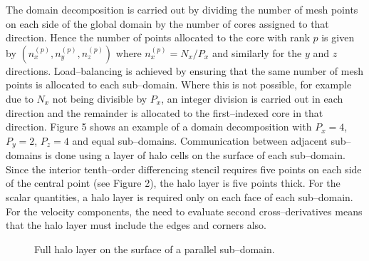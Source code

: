 \documentclass[dvips]{article}
\begin{document}
The domain decomposition is carried out by dividing the number of mesh points
on each side of the global domain by the number of cores assigned to that
direction.  Hence the number of points allocated to the core with rank $p$
is given by $(n_{x}^{(p)},n_{y}^{(p)},n_{z}^{(p)})$ where 
$n_{x}^{(p)}=N_{x}/P_{x}$ and similarly for the $y$ and $z$ directions.
Load--balancing is achieved by ensuring that the same number of mesh
points is allocated to each sub--domain.  Where this is not possible,
for example due to $N_{x}$ not being divisible by $P_{x}$, an integer
division is carried out in each direction and the remainder is allocated to
the first--indexed core in that direction.  Figure 5 shows an example of a
domain decomposition with $P_{x}=4$, $P_{y}=2$, $P_{z}=4$ and equal
sub--domains.  Communication between adjacent sub--domains is done using
a layer of halo cells on the surface of each sub--domain.  Since the interior
tenth--order differencing stencil requires five points on each side of the
central point (see Figure 2), the halo layer is five points thick.  For the
scalar quantities, a halo layer is required only on each face of each
sub--domain.  For the velocity components, the need to evaluate second
cross--derivatives means that the halo layer must include the edges and
corners also.   

\begin{figure}[htbp]
\begin{center}
\caption{Full halo layer on the surface of a parallel sub--domain.}
\end{center}
\end{figure}
\end{document}
